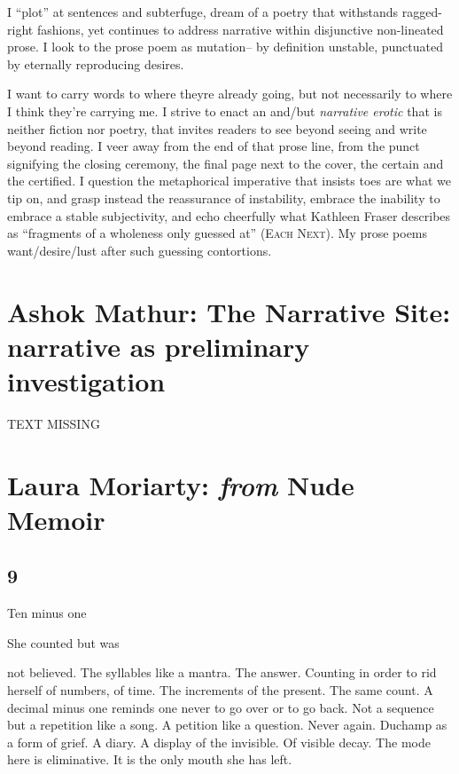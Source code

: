 \documentclass[
]{memoir}
\begin{document}
I ``plot'' at sentences and subterfuge, dream of a poetry that
withstands ragged-right fashions, yet continues to address narrative
within disjunctive non-lineated prose. I look to the prose poem as
mutation-- by definition unstable, punctuated by eternally reproducing
desires.

I want to carry words to where theyre already going, but not necessarily
to where I think they're carrying me. I strive to enact an and/but
\emph{narrative erotic} that is neither fiction nor poetry, that invites
readers to see beyond seeing and write beyond reading. I veer away from
the end of that prose line, from the punct signifying the closing
ceremony, the final page next to the cover, the certain and the
certified. I question the metaphorical imperative that insists toes are
what we tip on, and grasp instead the reassurance of instability,
embrace the inability to embrace a stable subjectivity, and echo
cheerfully what Kathleen Fraser describes as ``fragments of a wholeness
only guessed at'' (\textsc{Each Next}). My prose poems want/desire/lust
after such guessing contortions.

\hypertarget{ashok-mathur-the-narrative-site-narrative-as-preliminary-investigation}{%
\chapter{Ashok Mathur: The Narrative Site: narrative as preliminary
investigation}\label{ashok-mathur-the-narrative-site-narrative-as-preliminary-investigation}}

TEXT MISSING

\hypertarget{laura-moriarty-from-nude-memoir}{%
\chapter{\texorpdfstring{Laura Moriarty: \emph{from} Nude
Memoir}{Laura Moriarty: from Nude Memoir}}\label{laura-moriarty-from-nude-memoir}}

\hypertarget{section-12}{%
\section*{9}\label{section-12}}

Ten minus one

She counted but was

not believed. The syllables like a mantra. The answer. Counting in order
to rid herself of numbers, of time. The increments of the present. The
same count. A decimal minus one reminds one never to go over or to go
back. Not a sequence but a repetition like a song. A petition like a
question. Never again. Duchamp as a form of grief. A diary. A display of
the invisible. Of visible decay. The mode here is eliminative. It is the
only mouth she has left.
\end{document}
